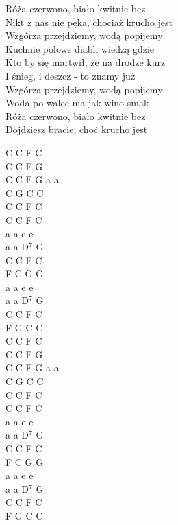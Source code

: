 \documentclass[a5paper, 10pt]{book}
\begin{document}
\begin{minipage}[t]{0.7\textwidth}
  \hspace*{5mm}Róża czerwono, biało kwitnie bez\\
  \hspace*{5mm}Nikt z nas nie pęka, chociaż krucho jest\\
  \hspace*{5mm}Wzgórza przejdziemy, wodą popijemy\\
  \hspace*{5mm}Kuchnie polowe diabli wiedzą gdzie\\
  \hspace*{5mm}Kto by się martwił, że na drodze kurz\\
  \hspace*{5mm}I śnieg, i deszcz - to znamy już\\
  \hspace*{5mm}Wzgórza przejdziemy, wodą popijemy\\
  \hspace*{5mm}Woda po walce ma jak wino smak\\
  \hspace*{5mm}Róża czerwono, biało kwitnie bez\\
  \hspace*{5mm}Dojdziesz bracie, choć krucho jest\\
\end{minipage}
\begin{minipage}[t]{0.3\textwidth}
  C C F C\\
  C C F G\\
  C C F G a a\\
  C G C C\\

  C C F C\\
  C C F C\\
  a a e e\\
  a a D$^7$ G\\
  C C F C\\
  F C G G\\
  a a e e\\
  a a D$^7$ G\\
  C C F C\\
  F G C C\\

  C C F C\\
  C C F G\\
  C C F G a a\\
  C G C C\\

  C C F C\\
  C C F C\\
  a a e e\\
  a a D$^7$ G\\
  C C F C\\
  F C G G\\
  a a e e\\
  a a D$^7$ G\\
  C C F C\\
  F G C C\\

\end{minipage}
\end{document}
